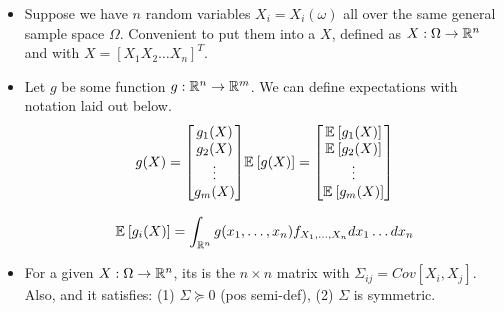 \documentclass[12pt]{article}
\newcommand{\myspace}{\vspace{2\bigskipamount}}
\newcommand\p{\Needspace{10\baselineskip} \noindent}
\begin{document}
\myspace
\p {}\vspace{-1em}
\begin{itemize}[--]
	\item Suppose we have $n$ random variables $X_i = X_i(\omega)$ all over the same general sample space $\Omega$. Convenient to put them into a  $X$, defined as $X: \Omega \rightarrow \mathbb{R}^n$ and with $X = [X_1 X_2 \ldots X_n]^T$.
	\item Let $g$ be some function $g: \mathbb{R}^n \rightarrow \mathbb{R}^m$. We can define expectations with notation laid out below. 
	\begin{align}
	\begin{split}
	g(X) = 
	\begin{bmatrix}
	g_1(X) \\
	g_2(X) \\
	\vdots \\
	g_m(X)
	\end{bmatrix}
	\end{split}
	\begin{split}
	\mathbb{E}_{}\left[g(X)\right] = 
	\begin{bmatrix}
	\mathbb{E}_{}\left[g_1(X)\right] \\
	\mathbb{E}_{}\left[g_2(X)\right] \\
	\vdots \\
	\mathbb{E}_{}\left[g_m(X)\right]
	\end{bmatrix}
	\end{split}
	\end{align}
	
	\begin{align}
	\mathbb{E}_{}\left[g_i(X)\right] = \int_{\mathbb{R}^n} g(x_1,\ldots, x_n)f_{X_1, \ldots, X_n} dx_1\ldots dx_n
	\end{align}
	
	\item For a given $X:\Omega \rightarrow \mathbb{R}^n$, its \textsc{} is the $n \times n$ matrix with $\Sigma_{ij} = Cov[X_i, X_j]$. Also, 
	and it satisfies: (1) $\Sigma \succeq 0$ (pos semi-def), (2) $\Sigma$ is symmetric.
\end{itemize}

\end{document}
